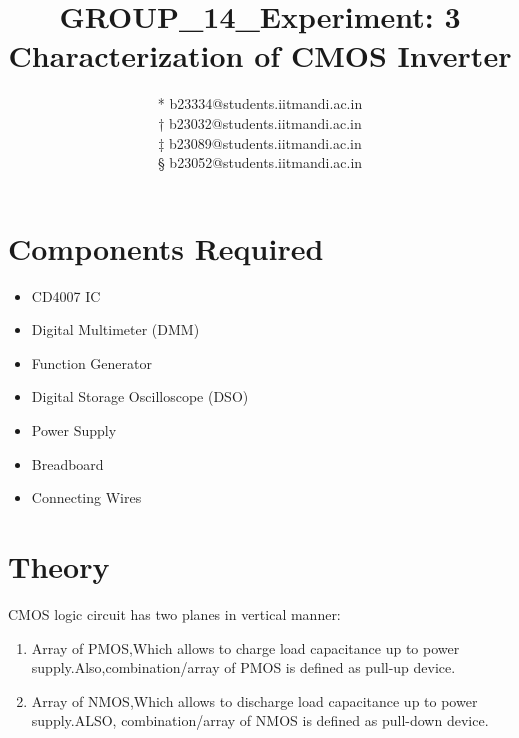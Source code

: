 \documentclass[9pt,conference]{IEEEtran}
\begin{document}
\title{GROUP\_14\_Experiment: 3\\Characterization of CMOS Inverter}

\author{
* b23334@students.iitmandi.ac.in \\
† b23032@students.iitmandi.ac.in \\
‡ b23089@students.iitmandi.ac.in \\
§ b23052@students.iitmandi.ac.in}
\date{}

\maketitle


\begin{abstract}
\end{abstract}

\section{Components Required}
\begin{itemize}
\begin{itemize}
    \item CD4007 IC
    \item Digital Multimeter (DMM)
    \item Function Generator
    \item Digital Storage Oscilloscope (DSO)
    \item Power Supply
    \item Breadboard
    \item Connecting Wires
\end{itemize}
\end{itemize}

\section{Theory}
CMOS logic circuit has two planes in vertical manner:
\begin{enumerate}
    \item Array of PMOS,Which allows to charge load capacitance up to power supply.Also,combination/array of PMOS is defined as pull-up device.
    \item Array of NMOS,Which allows to discharge load capacitance up to power supply.ALSO, combination/array of NMOS is defined as pull-down device.
\end{enumerate}
\end{document}
